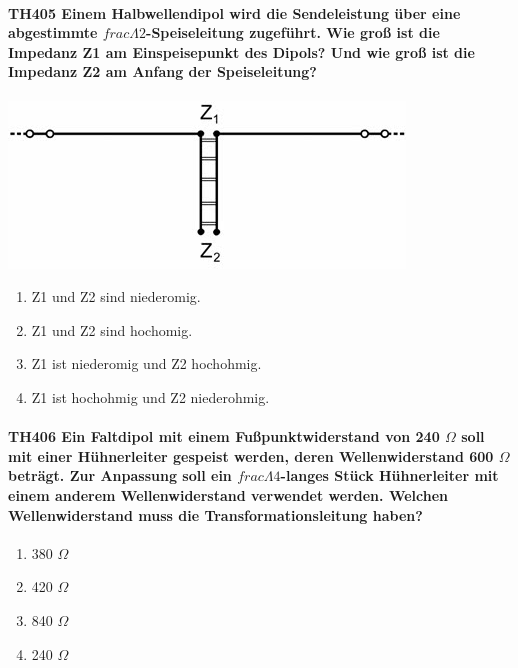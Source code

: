 \documentclass[8pt]{article}
\begin{document}
\paragraph*{TH405 Einem Halbwellendipol wird die Sendeleistung über eine abgestimmte $frac{\Lambda}{2}$-Speiseleitung zugeführt. Wie groß ist die Impedanz Z1 am Einspeisepunkt des Dipols? Und wie groß ist die Impedanz Z2 am Anfang der Speiseleitung?}
\begin{center}
	\begin{minipage}{\linewidth}
		\centering
		\includegraphics[scale=1.0]{pics/th405_a.jpg}
	\end{minipage}
\end{center}
\begin{enumerate}[nolistsep,label=\Alph*]
\item Z1 und Z2 sind niederomig.
\item Z1 und Z2 sind hochomig.
\item Z1 ist niederomig und Z2 hochohmig.
\item Z1 ist hochohmig und Z2 niederohmig.
\end{enumerate}

\paragraph*{TH406 Ein Faltdipol mit einem Fußpunktwiderstand von 240 $\Omega$ soll mit einer Hühnerleiter gespeist werden, deren Wellenwiderstand 600 $\Omega$ beträgt. Zur Anpassung soll ein $frac{\Lambda}{4}$-langes Stück Hühnerleiter mit einem anderem Wellenwiderstand verwendet werden. Welchen Wellenwiderstand muss die Transformationsleitung haben?}
\begin{enumerate}[nolistsep,label=\Alph*]
\item 380 $\Omega$
\item 420 $\Omega$
\item 840 $\Omega$
\item 240 $\Omega$
\end{enumerate}
\end{document}
